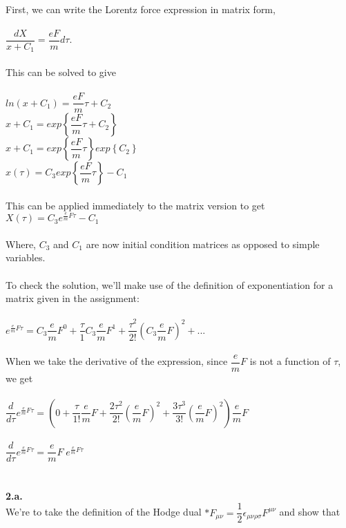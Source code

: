 \documentclass[prb,preprint]
{revtex4-1}
\newcommand{\PRLsep}{\noindent\makebox[\linewidth]{\resizebox{0.8888\linewidth}{2pt}{$\bullet$}}\bigskip}
\begin{document}
\\
First, we can write the Lorentz force expression in matrix form,
\\
\\
$\dfrac{dX}{x+C_1} = \dfrac{e F}{m} d\tau$.
\\
\\
This can be solved to give
\\
\\
$ln\left(x+C_1\right) = \dfrac{e F}{m} \tau + C_2$
\\
$x + C_1 = exp\left\{\dfrac{e F}{m} \tau + C_2\right\}$
\\
$x + C_1 = exp\left\{\dfrac{e F}{m} \tau\right\}exp\left\{C_2\right\}$
\\
$x\left(\tau\right) = C_3 exp\left\{\dfrac{e F}{m} \tau\right\} - C_1$
\\
\\
This can be applied immediately to the matrix version to get 
\\
$X\left(\tau\right) = C_3 e^{\frac{e}{m}F\tau} - C_1$
\\
\\
Where, $C_3$ and $C_1$ are now initial condition matrices as opposed to simple variables.  
\\
\\
To check the solution, we'll make use of the definition of exponentiation for a matrix given in the assignment:
\\
\\
$e^{\frac{e}{m}F\tau} = C_3\dfrac{e}{m}F^0 + \dfrac{\tau}{1}C_3\dfrac{e}{m}F^1 + \dfrac{\tau^2}{2!}\left(C_3\dfrac{e}{m}F\right)^2 + ...$
\\
\\
When we take the derivative of the expression, since $\dfrac{e}{m}F$ is not a function of $\tau$, we get
\\
\\
$\dfrac{d}{d\tau} e^{\frac{e}{m}F\tau} = \left(0 + \dfrac{\tau}{1!}\dfrac{e}{m}F + \dfrac{2\tau^2}{2!}\left(\dfrac{e}{m}F\right)^2 + \dfrac{3\tau^3}{3!}\left(\dfrac{e}{m}F\right)^2\right)\dfrac{e}{m}F$
\\
\\
$\dfrac{d}{d\tau} e^{\frac{e}{m}F\tau} = \dfrac{e}{m}F\;e^{\frac{e}{m}F\tau}$ 
\\
\\
\PRLsep
\\
\newpage
\textbf{2.a.}
\\
We're to take the definition of the Hodge dual
$*F_{\mu\nu} = \dfrac{1}{2}\epsilon_{\mu\nu\rho\sigma}F^{\mu\nu}$ and show that
\end{document}
